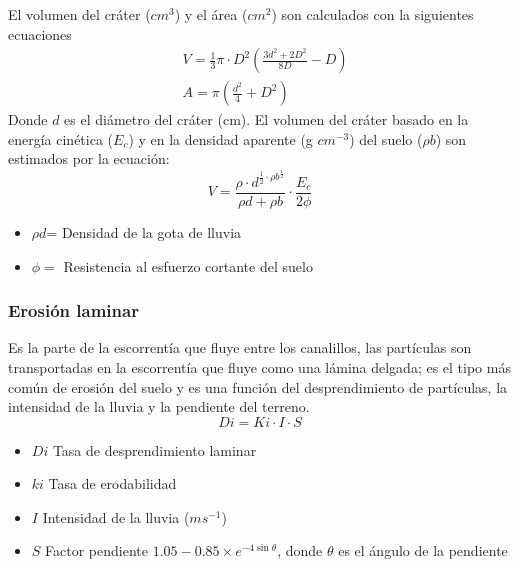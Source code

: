     El volumen del cráter ($cm^3$) y el área ($cm^2$) son calculados con la siguientes ecuaciones
    \begin{align}
        &V =\frac{1}{3}\pi\cdot D^2\left(\frac{3d^2 + 2D^2}{8D} - D\right)\\
        &A =\pi\left(\frac{d^{2}}{4} + D^2\right)
    \end{align}
    Donde $d$ es el diámetro del cráter (cm). El volumen del cráter basado en la energía cinética ($E_c$) y en la densidad aparente (g $cm^{-3}$) del suelo ($\rho b$) son estimados por la ecuación:
    \begin{equation}
        V =\frac{\rho \cdot d^{\frac{1}{2}\cdot \rho b^{\frac{1}{2}}}}{\rho d + \rho b}\cdot \frac{E_c}{2\phi}
    \end{equation}
    \begin{notation}
        \begin{itemize}
            \item $\rho d$= Densidad de la gota de lluvia
            \item $\phi =$ Resistencia al esfuerzo cortante del suelo
        \end{itemize}
    \end{notation}
    
    \subsubsection{Erosión laminar}
    Es la parte de la escorrentía que fluye entre los canalillos, las partículas son transportadas en la escorrentía que fluye como una lámina delgada; es el tipo más común de erosión del suelo y es una función del desprendimiento de partículas, la intensidad de la lluvia y la pendiente del terreno.
    \begin{equation}
        Di = Ki\cdot I\cdot S
    \end{equation}
    \begin{notation}
        \begin{itemize}
            \item $Di$ Tasa de desprendimiento laminar
            \item $ki$ Tasa de erodabilidad
            \item $I$ Intensidad de la lluvia ($ms^{-1}$)
            \item $S$ Factor pendiente $1.05-0.85\times e^{-4\sin{\theta}}$, donde $\theta$ es el ángulo de la pendiente
        \end{itemize}
    \end{notation}
